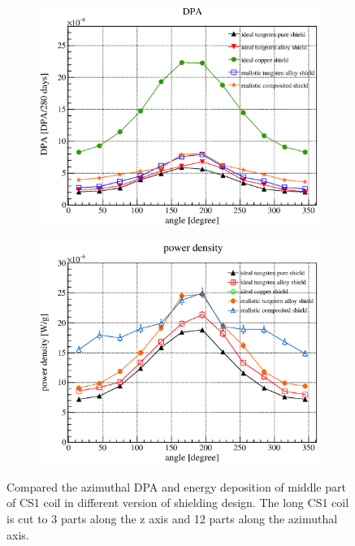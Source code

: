 \begin{figure}[H]
  \begin{subfigure}{0.3\textwidth}
   \centering
   \includegraphics[scale=0.43]{chapter3/fig/dpa.eps}
  \end{subfigure}
  \hspace{0.2\textwidth}
  \begin{subfigure}{0.3\textwidth}
   \centering
   \includegraphics[scale=0.43]{chapter3/fig/shieldheat.eps}
  \end{subfigure}
  \caption{Compared the azimuthal DPA and energy deposition of middle part of CS1 coil in different version of shielding design. The long CS1 coil is cut to 3 parts along the z axis and 12 parts along the azimuthal axis.}
  \label{2dpa}
 \end{figure}
